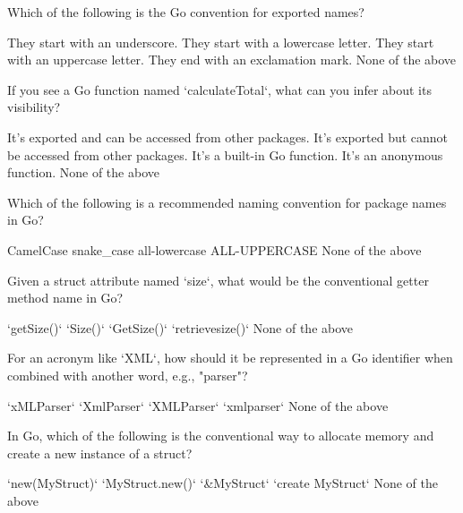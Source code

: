 \documentclass[12pt]{exam}
\begin{document}
\begin{questions}

\printanswers

\question[2]  Which of the following is the Go convention for exported names?
\begin{choices}
\choice  They start with an underscore.
\choice  They start with a lowercase letter.
\CorrectChoice  They start with an uppercase letter.
\choice  They end with an exclamation mark.
\choice  None of the above
\end{choices}
 
\question[2]  If you see a Go function named `calculateTotal`, what can you infer about its visibility?
\begin{choices}
\choice  It's exported and can be accessed from other packages.
\choice  It's exported but cannot be accessed from other packages.
\choice  It's a built-in Go function.
\choice  It's an anonymous function.
\CorrectChoice  None of the above
\end{choices}
 
\question[2]  Which of the following is a recommended naming convention for package names in Go?
\begin{choices}
\choice  CamelCase
\choice  snake\_case
\CorrectChoice  all-lowercase
\choice  ALL-UPPERCASE
\choice  None of the above
\end{choices}
 
\question[2]  Given a struct attribute named `size`, what would be the conventional getter method name in Go?
\begin{choices}
\choice  `getSize()`
\choice  `Size()`
\choice  `GetSize()`
\choice  `retrievesize()`
\CorrectChoice  None of the above
\end{choices}
 
\question[2]  For an acronym like `XML`, how should it be represented in a Go identifier when combined with another word, e.g., "parser"?
\begin{choices}
\choice  `xMLParser`
\choice  `XmlParser`
\CorrectChoice  `XMLParser`
\choice  `xmlparser`
\choice  None of the above
\end{choices}
 
\question[2]  In Go, which of the following is the conventional way to allocate memory and create a new instance of a struct?
\begin{choices}
\choice  `new(MyStruct)`
\choice  `MyStruct.new()`
\CorrectChoice  `\&MyStruct{}`
\choice  `create MyStruct`
\choice  None of the above
\end{choices}
 

\end{questions}
\end{document}
